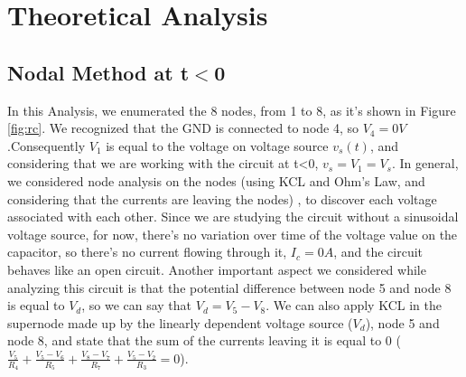\section{Theoretical Analysis} \label{sec:analysis}

\subsection{Nodal Method at t$<$0}


In this Analysis, we enumerated the 8 nodes, from 1 to 8, as it's shown in Figure \ref{fig:rc}. We recognized that the GND is connected to node 4, so $V_{4}=0V$.Consequently $V_1$ is equal to the voltage on voltage source $v_s(t)$, and considering that we are working with the circuit at t<0, $v_s=V_1=V_s$.
In general, we considered node analysis on the nodes (using KCL and Ohm's Law, and considering that the currents are leaving the nodes) , to discover each voltage associated with each other. 
Since we are studying the circuit without a sinusoidal voltage source, for now, there's no variation over time of the voltage value on the capacitor, so there's no current flowing through it, $I_c=0A$, and the circuit behaves like an open circuit.
Another important aspect we considered while analyzing this circuit is that the potential difference between node 5 and node 8 is equal to $V_d$, so we can say that $V_d=V_5-V_8$. We can also apply KCL in the supernode made up by the linearly dependent voltage source ($V_d$), node 5 and node 8, and state that the sum of the currents leaving it is equal to 0 ($\frac{V_5}{R_4} + \frac{V_5-V_6}{R_5} + \frac{V_8-V_7}{R_7} + \frac{V_5-V_2}{R_3}=0$).


